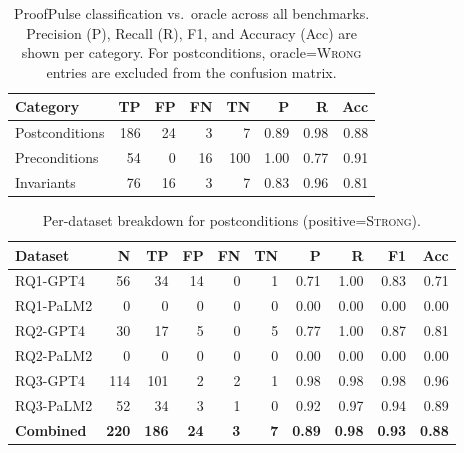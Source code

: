 \begin{table}[h]
  \centering
  \caption{ProofPulse classification vs.\ oracle across all benchmarks. Precision (P), Recall (R), F1, and Accuracy (Acc) are shown per category. For postconditions, oracle=\textsc{Wrong} entries are excluded from the confusion matrix.}
  \label{tab:overall-results}
  \begin{tabular}{lrrrrrrr}
    \toprule
    \textbf{Category} & \textbf{TP} & \textbf{FP} & \textbf{FN} & \textbf{TN} & \textbf{P} & \textbf{R} & \textbf{Acc} \\
    \midrule
    Postconditions & 186 & 24 & 3 & 7 & 0.89 & 0.98 & 0.88 \\
    Preconditions  & 54 & 0 & 16 & 100 & 1.00 & 0.77 & 0.91 \\
    Invariants     & 76 & 16 & 3 & 7 & 0.83 & 0.96 & 0.81 \\
    \bottomrule
  \end{tabular}
\end{table}

\begin{table}[h]
  \centering
  \caption{Per-dataset breakdown for postconditions (positive=\textsc{Strong}).}
  \label{tab:postconditions}
  \begin{tabular}{lrrrrrrrrr}
    \toprule
    \textbf{Dataset} & \textbf{N} & \textbf{TP} & \textbf{FP} & \textbf{FN} & \textbf{TN} & \textbf{P} & \textbf{R}  & \textbf{F1} & \textbf{Acc} \\
    \midrule
    RQ1-GPT4  & 56  & 34 & 14 & 0 &  1 & 0.71 & 1.00 & 0.83 & 0.71 \\
    RQ1-PaLM2  & 0  & 0 & 0 & 0 &  0 & 0.00 & 0.00 & 0.00 & 0.00 \\
    RQ2-GPT4  & 30  & 17 & 5 & 0 &  5 & 0.77 & 1.00 & 0.87 & 0.81 \\
    RQ2-PaLM2  & 0  & 0 & 0 & 0 &  0 & 0.00 & 0.00 & 0.00 & 0.00 \\
    RQ3-GPT4  & 114  & 101 & 2 & 2 &  1 & 0.98 & 0.98 & 0.98 & 0.96 \\
    RQ3-PaLM2  & 52  & 34 & 3 & 1 &  0 & 0.92 & 0.97 & 0.94 & 0.89 \\
    \midrule
    \textbf{Combined} & \textbf{220} & \textbf{186} & \textbf{24} & \textbf{3} & \textbf{7} & \textbf{0.89} & \textbf{0.98} & \textbf{0.93} & \textbf{0.88} \\
    \bottomrule
  \end{tabular}
\end{table}

